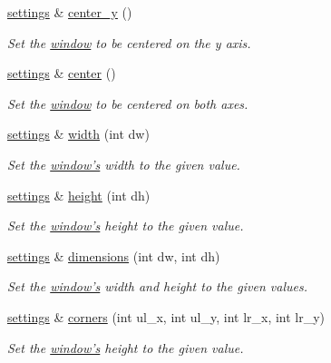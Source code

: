 \begin{DoxyCompactItemize}
\hyperlink{classgfx_1_1window_1_1settings}{settings} \& \hyperlink{classgfx_1_1window_1_1settings_a6def8e531d663846945ce7b02ccfb734}{center\-\_\-y} ()
\begin{DoxyCompactList}\small\item\em Set the \hyperlink{classgfx_1_1window}{window} to be centered on the y axis. \end{DoxyCompactList}\item 
\hyperlink{classgfx_1_1window_1_1settings}{settings} \& \hyperlink{classgfx_1_1window_1_1settings_a08bde3f0027bc7f5c0c89bb4ac756c35}{center} ()
\begin{DoxyCompactList}\small\item\em Set the \hyperlink{classgfx_1_1window}{window} to be centered on both axes. \end{DoxyCompactList}\item 
\hyperlink{classgfx_1_1window_1_1settings}{settings} \& \hyperlink{classgfx_1_1window_1_1settings_a5f4096da442312c25837e44df9f16cd4}{width} (int dw)
\begin{DoxyCompactList}\small\item\em Set the \hyperlink{classgfx_1_1window}{window's} width to the given value. \end{DoxyCompactList}\item 
\hyperlink{classgfx_1_1window_1_1settings}{settings} \& \hyperlink{classgfx_1_1window_1_1settings_a94b81d30c82e3ddb50ea677dd7e3529a}{height} (int dh)
\begin{DoxyCompactList}\small\item\em Set the \hyperlink{classgfx_1_1window}{window's} height to the given value. \end{DoxyCompactList}\item 
\hyperlink{classgfx_1_1window_1_1settings}{settings} \& \hyperlink{classgfx_1_1window_1_1settings_a424f034ffd55ba140d61f49c444d7dc6}{dimensions} (int dw, int dh)
\begin{DoxyCompactList}\small\item\em Set the \hyperlink{classgfx_1_1window}{window's} width and height to the given values. \end{DoxyCompactList}\item 
\hyperlink{classgfx_1_1window_1_1settings}{settings} \& \hyperlink{classgfx_1_1window_1_1settings_aa56582174b46b08b0eaa0819f81ced60}{corners} (int ul\-\_\-x, int ul\-\_\-y, int lr\-\_\-x, int lr\-\_\-y)
\begin{DoxyCompactList}\small\item\em Set the \hyperlink{classgfx_1_1window}{window's} height to the given value. \end{DoxyCompactList}\item 

\end{DoxyCompactItemize}
